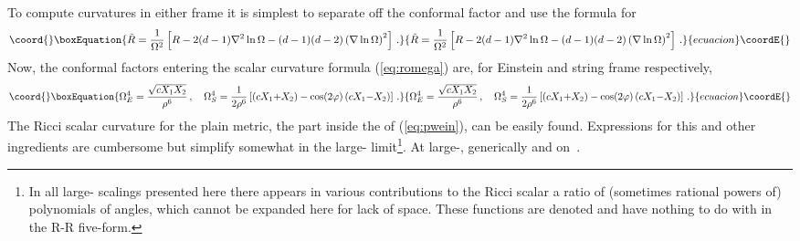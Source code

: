 \documentclass[a4paper,12pt]{amsproc}
\numberwithin{equation}{section}
\def\vtpt{\myHighlight{$\vartheta=\pi/2$}\coordHE{}\,}
\begin{document}
To compute curvatures in either frame it is simplest to separate off
the conformal factor and use the formula for
\coordHE{}
%
\begin{equation}\coord{}\boxEquation{\label{eq:romega}
{\tilde{R}}={{1}\over{\Omega^2}}\left[R-2(d-1)\nabla^2 \ln\Omega
- (d-1)(d-2)\left(\nabla \ln\Omega\right)^2 \right] \,.
}{{\tilde{R}}={{1}\over{\Omega^2}}\left[R-2(d-1)\nabla^2 \ln\Omega
- (d-1)(d-2)\left(\nabla \ln\Omega\right)^2 \right] \,.
}{ecuacion}\coordE{}\end{equation}
%
Now, the conformal factors entering the scalar curvature formula
(\ref{eq:romega}) are, for Einstein and string frame respectively,
%
\begin{equation}\coord{}\boxEquation{
\Omega_E^4 = {{\sqrt{cX_1X_2}}\over{\rho^6}} \,,\quad 
\Omega_S^4 = {{1}\over{2\rho^6}} \left[ \left(cX_1{+}X_2\right)
-\cos(2\varphi)\left(cX_1{-}X_2\right) \right] \,.
}{
\Omega_E^4 = {{\sqrt{cX_1X_2}}\over{\rho^6}} \,,\quad 
\Omega_S^4 = {{1}\over{2\rho^6}} \left[ \left(cX_1{+}X_2\right)
-\cos(2\varphi)\left(cX_1{-}X_2\right) \right] \,.
}{ecuacion}\coordE{}\end{equation}
%
The Ricci scalar curvature for the plain metric, the part inside the
\myHighlight{$\{ \}$}\coordHE{} of (\ref{eq:pwein}), can be easily found.  Expressions for
this and other ingredients are cumbersome but simplify somewhat in the
large-\coordHE{} limit\footnote{In all large-\coordHE{} scalings presented here
there appears in various contributions to the Ricci scalar a ratio of
(sometimes rational powers of) polynomials of angles, which cannot be
expanded here for lack of space.  These functions are denoted \coordHE{}
and have nothing to do with \coordHE{} in the R-R five-form.}.  At large-\coordHE{},
%
\coordHE{} generically and \coordHE{} on \vtpt.
\end{document}
